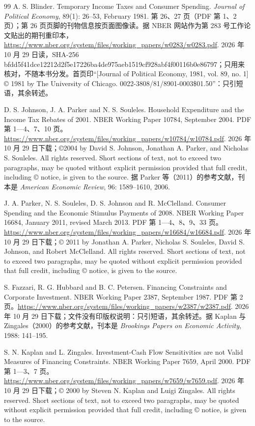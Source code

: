 \begin{thebibliography}{99}
 A. S. Blinder. Temporary Income Taxes and Consumer Spending. \emph{Journal of Political Economy}, 89(1): 26--53, February 1981. 第 26、27 页（PDF 第 1、2 页）；第 26 页页脚的刊物信息按页面图像读。据 NBER 网站作为第 283 号工作论文贴出的期刊重印本，\url{https://www.nber.org/system/files/working_papers/w0283/w0283.pdf}. 2026 年 10 月 29 日读，SHA-256 bfdd5f41dce12212d2f5e17226ba4de975aeb1519cf928abf4f00116b0e86797；只用来核对，不随本书分发。首页印“[Journal of Political Economy, 1981, vol. 89, no. 1] © 1981 by The University of Chicago. 0022-3808/81/8901-0003\$01.50”：只引短语，其余转述。

 D. S. Johnson, J. A. Parker and N. S. Souleles. Household Expenditure and the Income Tax Rebates of 2001. NBER Working Paper 10784, September 2004. PDF 第 1—4、7、10 页。\url{https://www.nber.org/system/files/working_papers/w10784/w10784.pdf}. 2026 年 10 月 29 日下载；©2004 by David S. Johnson, Jonathan A. Parker, and Nicholas S. Souleles. All rights reserved. Short sections of text, not to exceed two paragraphs, may be quoted without explicit permission provided that full credit, including © notice, is given to the source. 据 Parker 等（2011）的参考文献，刊本是 \emph{American Economic Review}, 96: 1589--1610, 2006.

 J. A. Parker, N. S. Souleles, D. S. Johnson and R. McClelland. Consumer Spending and the Economic Stimulus Payments of 2008. NBER Working Paper 16684, January 2011, revised March 2013. PDF 第 1—4、8、9、33 页。\url{https://www.nber.org/system/files/working_papers/w16684/w16684.pdf}. 2026 年 10 月 29 日下载；© 2011 by Jonathan A. Parker, Nicholas S. Souleles, David S. Johnson, and Robert McClelland. All rights reserved. Short sections of text, not to exceed two paragraphs, may be quoted without explicit permission provided that full credit, including © notice, is given to the source.

 S. Fazzari, R. G. Hubbard and B. C. Petersen. Financing Constraints and Corporate Investment. NBER Working Paper 2387, September 1987. PDF 第 2 页。\url{https://www.nber.org/system/files/working_papers/w2387/w2387.pdf}. 2026 年 10 月 29 日下载；文件没有印版权说明：只引短语，其余转述。据 Kaplan 与 Zingales（2000）的参考文献，刊本是 \emph{Brookings Papers on Economic Activity}, 1988: 141--195.

 S. N. Kaplan and L. Zingales. Investment-Cash Flow Sensitivities are not Valid Measures of Financing Constraints. NBER Working Paper 7659, April 2000. PDF 第 1—3、7 页。\url{https://www.nber.org/system/files/working_papers/w7659/w7659.pdf}. 2026 年 10 月 29 日下载；© 2000 by Steven N. Kaplan and Luigi Zingales. All rights reserved. Short sections of text, not to exceed two paragraphs, may be quoted without explicit permission provided that full credit, including © notice, is given to the source.


\end{thebibliography}
